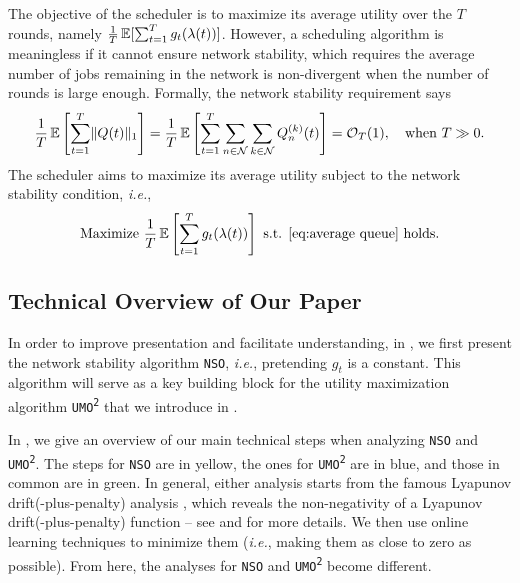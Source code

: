 \documentclass[11pt,fullpage,letterpaper]{article} %
\renewcommand{\bm}[1]{#1}%
\renewcommand{\O}{\operatorname{\mathcal O}}
\newcommand{\E}{\operatornamewithlimits{\mathbb{E}}}
\newcommand{\mN}{{\mathcal N}}
\newcommand{\SSAlg}{\texttt{NSO}\xspace}
\newcommand{\UMAlg}{\texttt{UMO}\textsuperscript{\texttt{2}}\xspace}
\begin{document}
The objective of the scheduler is to maximize its average utility over the $T$ rounds, namely $\frac 1T \E[\sum_{t=1}^T g_t(\bm \lambda(t))]$.
However, a scheduling algorithm is meaningless if it cannot ensure network stability, which requires the average number of jobs remaining in the network is non-divergent when the number of rounds is large enough.
Formally, the network stability requirement says
\begin{equation}
\frac 1T \E\left [\sum_{t=1}^T \lVert \bm Q(t)\rVert_1\right ]=\frac 1T\E\left [\sum_{t=1}^T \sum_{n\in \mN} \sum_{k\in \mN} Q_{n}^{(k)}(t)\right ]=\O_T(1),\quad \text{when }T\gg 0.\label{eq:average queue}
\end{equation}
The scheduler aims to maximize its average utility subject to the network stability condition, \textit{i.e.},
\begin{equation}\label{eq:average reward}
\text{Maximize }\frac 1T \E\left [\sum_{t=1}^T g_t(\bm \lambda(t))\right ]\text{ s.t. \Cref{eq:average queue} holds}.
\end{equation}

\subsection{Technical Overview of Our Paper}
In order to improve presentation and facilitate understanding, in , we first present the network stability algorithm \SSAlg, \textit{i.e.}, pretending $g_t$ is a constant. This algorithm will serve as a key building block for the utility maximization algorithm \UMAlg that we introduce in .

In , we give an overview of our main technical steps when analyzing \SSAlg and \UMAlg. The steps for \SSAlg are in yellow, the ones for \UMAlg are in blue, and those in common are in green.
In general, either analysis starts from the famous Lyapunov drift(-plus-penalty) analysis \citep[\S 4]{neely2010stochastic}, which reveals the non-negativity of a Lyapunov drift(-plus-penalty) function -- see  and  for more details.
We then use online learning techniques to minimize them (\textit{i.e.}, making them as close to zero as possible). From here, the analyses for \SSAlg and \UMAlg become different.
\end{document}
